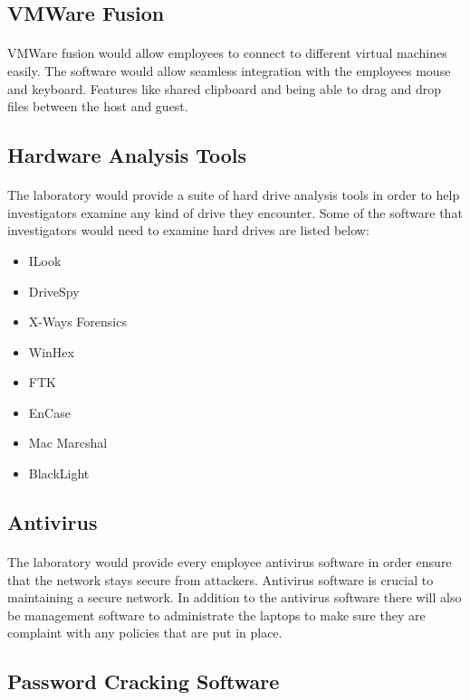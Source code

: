 \documentclass[12pt]{article}
\begin{document}
\subsection{VMWare Fusion} 
\paragraph{}
VMWare fusion would allow employees to connect to different virtual machines easily.
The software would allow seamless integration with the employees mouse and keyboard. 
Features like shared clipboard and being able to drag and drop files between the host and guest.
\subsection{Hardware Analysis Tools}
\paragraph{}
The laboratory would provide a suite of hard drive analysis tools in order to help investigators examine any kind of drive they encounter. Some of the software that investigators would need to examine hard drives are listed below:
\cite[p.~132]{hayes}
\begin{itemize}
\item ILook
\item DriveSpy
\item X-Ways Forensics
\item WinHex
\item FTK
\item EnCase
\item Mac Marcshal
\item BlackLight
\end{itemize}
\subsection{Antivirus}
\paragraph{}
The laboratory would provide every employee antivirus software in order ensure that the network stays secure from attackers.
Antivirus software is crucial to maintaining a secure network. 
In addition to the antivirus software there will also be management software to administrate the laptops to make sure they are complaint with any policies that are put in place.
\subsection{Password Cracking Software}
\end{document}
